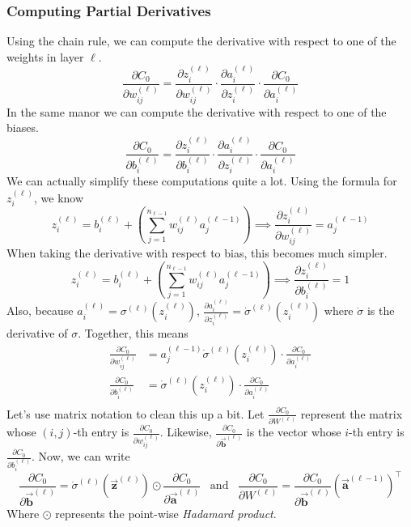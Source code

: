 \documentclass[12pt, letterpaper]{article}
\theoremstyle{definition}
\theoremstyle{remark}
\newcommand{\vect}[1]{\vec{\mathbf{#1}}}
\begin{document}
\subsubsection{Computing Partial Derivatives}

Using the chain rule, we can compute the derivative with respect to one of the weights in layer $\ell$.
\[
    \frac{\partial C_0}{\partial w_{ij}^{(\ell)}} = \frac{\partial z_i^{(\ell)}}{\partial w_{ij}^{(\ell)}} \cdot 
                                                    \frac{\partial a_i^{(\ell)}}{\partial z_i^{(\ell)}} \cdot 
                                                    \frac{\partial C_0}{\partial a_i^{(\ell)}}
\]
In the same manor we can compute the derivative with respect to one of the biases.
\[
    \frac{\partial C_0}{\partial b_i^{(\ell)}} = \frac{\partial z_i^{(\ell)}}{\partial b_i^{(\ell)}} \cdot 
                                                    \frac{\partial a_i^{(\ell)}}{\partial z_i^{(\ell)}} \cdot 
                                                    \frac{\partial C_0}{\partial a_i^{(\ell)}}
\]
We can actually simplify these computations quite a lot. Using the formula for $z_i^{(\ell)}$, we know 
\[
    z_i^{(\ell)} = b_i^{(\ell)} + \left(\sum_{j = 1}^{n_{\ell - 1}} w_{ij}^{(\ell)} a_j^{(\ell - 1)}\right)
    \implies \frac{\partial z_i^{(\ell)}}{\partial w_{ij}^{(\ell)}} = a_j^{(\ell - 1)}
\]
When taking the derivative with respect to bias, this becomes much simpler.
\[
    z_i^{(\ell)} = b_i^{(\ell)} + \left(\sum_{j = 1}^{n_{\ell - 1}} w_{ij}^{(\ell)} a_j^{(\ell - 1)}\right)
    \implies \frac{\partial z_i^{(\ell)}}{\partial b_{i}^{(\ell)}} = 1
\]
Also, because $a_i^{(\ell)} = \sigma^{(\ell)}(z_i^{(\ell)})$, $\frac{\partial a_i^{(\ell)}}{\partial z_i^{(\ell)}} = \dot{\sigma}^{(\ell)}(z_i^{(\ell)})$
where $\dot\sigma$ is the derivative of $\sigma$. Together, this means 
\begin{align*}
    \frac{\partial C_0}{\partial w_{ij}^{(\ell)}} &= a_j^{(\ell - 1)} \dot\sigma^{(\ell)}(z_i^{(\ell)})\cdot\frac{\partial C_0}{\partial a_i^{(\ell)}} \\
    \frac{\partial C_0}{\partial b_{i}^{(\ell)}} &= \dot\sigma^{(\ell)}(z_i^{(\ell)})\cdot\frac{\partial C_0}{\partial a_i^{(\ell)}} \\
\end{align*}
Let's use matrix notation to clean this up a bit. Let $\frac{\partial C_0}{\partial W^{(\ell)}}$ represent the matrix whose $(i, j)$-th entry 
is $\frac{\partial C_0}{\partial w_{ij}^{(\ell)}}$. Likewise, $\frac{\partial C_0}{\partial {\vect b}^{(\ell)}}$ is the vector whose $i$-th 
entry is $\frac{\partial C_0}{\partial b_{i}^{(\ell)}}$. Now, we can write 
\[
    \frac{\partial C_0}{\partial \vect{b}^{(\ell)}} = \dot\sigma^{(\ell)}(\vect{z}^{(\ell)}) \odot \frac{\partial C_0}{\partial \vect{a}^{(\ell)}} \;\;\; \text{and} \;\;\; \frac{\partial C_0}{\partial W^{(\ell)}} = \frac{\partial C_0}{\partial \vect{b}^{(\ell)}} \left(\vect{a}^{(\ell - 1)}\right)^\top
\]
Where $\odot$ represents the point-wise \textit{Hadamard product}.
\end{document}
